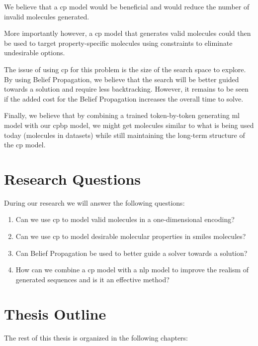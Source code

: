\documentclass[../Document.tex]{subfiles}
\begin{document}
We believe that a \gls{cp} model would be beneficial and would reduce the number of invalid molecules generated.

More importantly however, a \gls{cp} model that generates valid molecules could then be used to target property-specific molecules using constraints to eliminate undesirable options.

The issue of using \gls{cp} for this problem is the size of the search space to explore. By using Belief Propagation, we believe that the search will be better guided towards a solution and require less backtracking. However, it remains to be seen if the added cost for the Belief Propagation increases the overall time to solve.

Finally, we believe that by combining a trained token-by-token generating \gls{ml} model with our \gls{cpbp} model, we might get molecules similar to what is being used today (molecules in datasets) while still maintaining the long-term structure of the \gls{cp} model.


\section{Research Questions}
\label{sec:intro/questions}
During our research we will answer the following questions:

\begin{enumerate}
    \item Can we use \acrshort{cp} to model valid molecules in a one-dimensional encoding?
    \item Can we use \acrshort{cp} to model desirable molecular properties in \acrshort{smiles} molecules?
    \item Can Belief Propagation be used to better guide a solver towards a solution?
    \item How can we combine a \acrshort{cp} model with a \acrshort{nlp} model to improve the realism of generated sequences and is it an effective method?
\end{enumerate}

\section{Thesis Outline}
\label{sec:intro/outline}
The rest of this thesis is organized in the following chapters:
\end{document}
